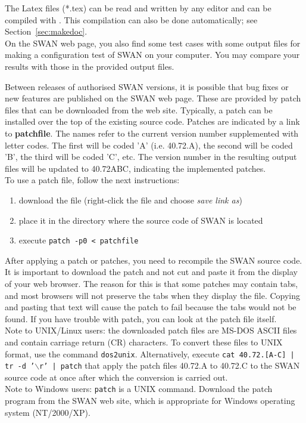 \documentclass[12pt]{book}
\begin{document}
\noindent
The Latex files (*.tex) can be read and written by any editor and can be compiled with \LaTeXe.
This compilation can also be done automatically; see Section~\ref{sec:makedoc}.
\\[2ex]
\noindent
On the SWAN web page, you also find some test cases with some output files for making a
configuration test of SWAN on your computer. You may compare your results with those in
the provided output files.

 \label{ch:patch}

Between releases of authorised SWAN versions, it is possible that bug fixes or new
features are published on the SWAN web page. These are provided by patch files that can
be downloaded from the web site. Typically, a patch can be installed over the top of the
existing source code. Patches are indicated by a link to {\bf patchfile}. The names
refer to the current version number supplemented with letter codes. The first will be
coded 'A' (i.e. 40.72.A), the second will be coded 'B', the third will be coded 'C', etc.
The version number in the resulting output files will be updated to 40.72ABC, indicating
the implemented patches.
\\[2ex]
\noindent
To use a patch file, follow the next instructions:
\begin{enumerate}
  \item download the file (right-click the file and choose {\it save link as})
  \item place it in the directory where the source code of SWAN is located
  \item execute {\tt patch -p0 < patchfile}
\end{enumerate}
After applying a patch or patches, you need to recompile the SWAN source code.
\\[2ex]
\noindent
It is important to download the patch and not cut and paste it from the display
of your web browser. The reason for this is that some patches may contain tabs,
and most browsers will not preserve the tabs when they display the file. Copying
and pasting that text will cause the patch to fail because the tabs would not be
found. If you have trouble with patch, you can look at the patch file itself.
\\[2ex]
\noindent
Note to UNIX/Linux users:
the downloaded patch files are MS-DOS ASCII files and contain carriage return (CR) characters.
To convert these files to  UNIX format, use the command {\tt dos2unix}. Alternatively,
execute {\tt cat 40.72.[A-C] | tr -d '$\backslash$r' | patch} that apply the patch files
40.72.A to 40.72.C to the SWAN source code at once after which the conversion is
carried out.
\\[2ex]
\noindent
Note to Windows users: {\tt patch} is a UNIX command. Download the patch program
from the SWAN web site, which is appropriate for Windows operating system (NT/2000/XP).
\end{document}
